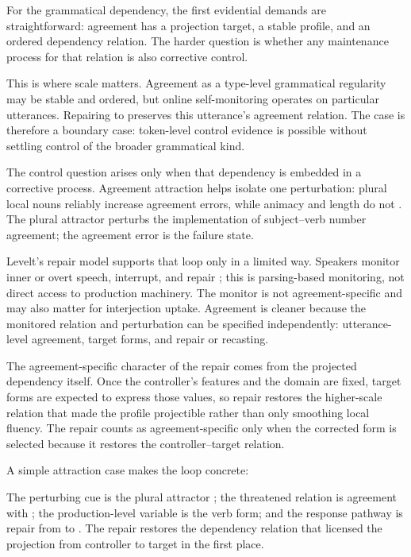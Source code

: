 \documentclass[12pt]{article}
\begin{document}
For the grammatical dependency, the first evidential demands are straightforward:
agreement has a projection target, a stable profile, and an ordered dependency
relation. The harder question is whether any maintenance process for that relation
is also corrective control.

This is where scale matters. Agreement as a type-level grammatical regularity may
be stable and ordered, but online self-monitoring operates on particular
utterances. Repairing  to  preserves this utterance's agreement relation. The case is
therefore a boundary case: token-level control evidence is possible without
settling control of the broader grammatical kind.

The control question arises only when that dependency is embedded in a corrective
process. Agreement attraction helps isolate one perturbation: plural local nouns
reliably increase agreement errors, while animacy and length do not
\citep{bockMiller1991}. The plural attractor perturbs the implementation of
subject--verb number agreement; the agreement error is the failure state.

Levelt's repair model supports that loop only in a limited way. Speakers monitor
inner or overt speech, interrupt, and repair \citep{levelt1983}; this is
parsing-based monitoring, not direct access to production machinery. The monitor
is not agreement-specific and may also matter for interjection uptake. Agreement
is cleaner because the monitored relation and perturbation can be specified
independently: utterance-level agreement, target forms, and repair or recasting.

The agreement-specific character of the repair comes from the projected dependency
itself. Once the controller's features and the domain are fixed, target forms are
expected to express those values, so repair restores the higher-scale relation that
made the profile projectible rather than only smoothing local fluency. The repair
counts as agreement-specific only when the corrected form is selected because it
restores the controller--target relation.

A simple attraction case makes the loop concrete:

\ea\label{ex:agreement-repair}
\z

The perturbing cue is the plural attractor ; the threatened
relation is agreement with ; the production-level variable is the verb
form; and the response pathway is repair from  to . The
repair restores the dependency relation that licensed the projection from
controller to target in the first place.
\end{document}
